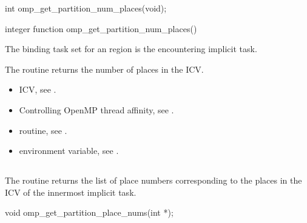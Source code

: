 \format
\begin{ccppspecific}
\begin{ompcFunction}
int omp_get_partition_num_places(void);
\end{ompcFunction}
\end{ccppspecific}

\begin{fortranspecific}
\begin{ompfFunction}
integer function omp_get_partition_num_places()
\end{ompfFunction}
\end{fortranspecific}

\binding
The binding task set for an   
region is the encountering implicit task.

\effect
The  routine returns the number 
of places in the  ICV.

\crossreferences
\begin{itemize}
\item {} ICV, see
.

\item Controlling OpenMP thread affinity, see
.


\item {} routine, see
.

\item {} environment variable, see
.
\end{itemize}



\subsection{}
\label{subsec:omp_get_partition_place_nums}

\summary
The  routine returns the list of 
place numbers corresponding to the places in the  
ICV of the innermost implicit task.

\format
\begin{ccppspecific}
\begin{ompcFunction}
void omp_get_partition_place_nums(int *);
\end{ompcFunction}
\end{ccppspecific}


